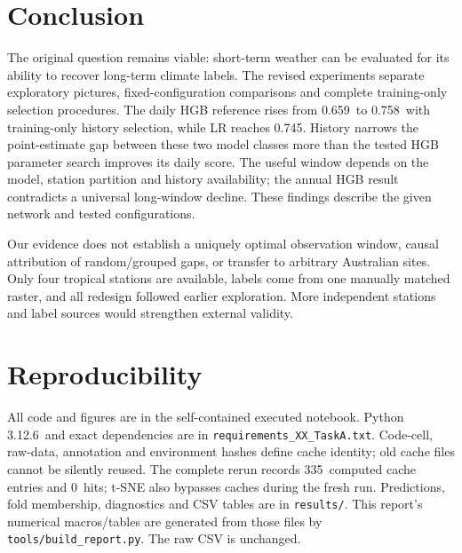\documentclass{article}
\newcommand{\DailyHGB}{0.659}
\newcommand{\SelectedWindow}{0.758}
\newcommand{\SelectedWindowLR}{0.745}
\newcommand{\PythonVersion}{3.12.6}
\newcommand{\CacheHits}{0}
\newcommand{\CacheMisses}{335}
\begin{document}
\section{Conclusion}
The original question remains viable: short-term weather can be evaluated for its ability to recover long-term climate labels. The revised experiments separate exploratory pictures, fixed-configuration comparisons and complete training-only selection procedures. The daily HGB reference rises from \DailyHGB\ to \SelectedWindow\ with training-only history selection, while LR reaches \SelectedWindowLR. History narrows the point-estimate gap between these two model classes more than the tested HGB parameter search improves its daily score. The useful window depends on the model, station partition and history availability; the annual HGB result contradicts a universal long-window decline. These findings describe the given network and tested configurations.

Our evidence does not establish a uniquely optimal observation window, causal attribution of random/grouped gaps, or transfer to arbitrary Australian sites. Only four tropical stations are available, labels come from one manually matched raster, and all redesign followed earlier exploration. More independent stations and label sources would strengthen external validity.

\section*{Reproducibility}
All code and figures are in the self-contained executed notebook. Python \PythonVersion\ and exact dependencies are in \texttt{requirements\_XX\_TaskA.txt}. Code-cell, raw-data, annotation and environment hashes define cache identity; old cache files cannot be silently reused. The complete rerun records \CacheMisses\ computed cache entries and \CacheHits\ hits; t-SNE also bypasses caches during the fresh run. Predictions, fold membership, diagnostics and CSV tables are in \texttt{results/}. This report's numerical macros/tables are generated from those files by \texttt{tools/build\_report.py}. The raw CSV is unchanged.
\end{document}
